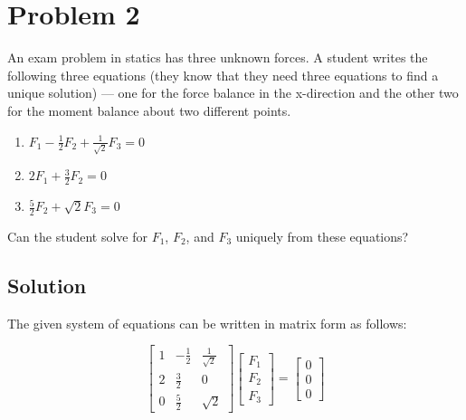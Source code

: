 \section*{Problem 2}

An exam problem in statics has three unknown forces.
A student writes the following three equations (they know that they need three equations to find a unique solution) --- one for the force balance in the x-direction and the other two for the moment balance about two different points.

\begin{enumerate}
    \item \( F_1 - \frac{1}{2} F_2 + \frac{1}{\sqrt{2}} F_3 = 0 \)
    \item \( 2 F_1 + \frac{3}{2} F_2 = 0 \)
    \item \( \frac{5}{2} F_2 + \sqrt{2} F_3 = 0 \)
\end{enumerate}

Can the student solve for \( F_1 \), \( F_2 \), and \( F_3 \) uniquely from these equations?

\subsection*{Solution}

The given system of equations can be written in matrix form as follows:

\[
    \begin{bmatrix}
        1 & -\frac{1}{2} & \frac{1}{\sqrt{2}} \\
        2 & \frac{3}{2}  & 0                  \\
        0 & \frac{5}{2}  & \sqrt{2}
    \end{bmatrix}
    \begin{bmatrix}
        F_1 \\
        F_2 \\
        F_3
    \end{bmatrix}
    =
    \begin{bmatrix}
        0 \\
        0 \\
        0
    \end{bmatrix}
\]

